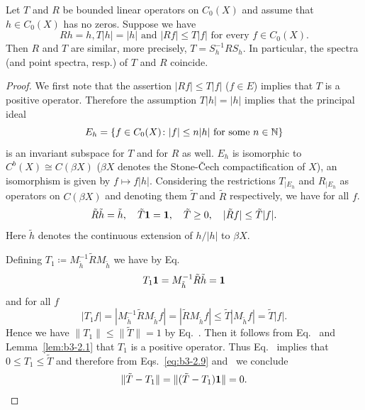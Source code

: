 \begin{lemma}\label{lem:b3-2.3}%
Let $T$ and $R$ be bounded linear operators on $C_{0}(X)$ and assume that $h \in C_{0}(X)$ has no zeros. 
Suppose we have
\begin{equation}\label{eq:b3-2.8}
	Rh = h, T|h| = |h| \text{ and } |Rf| \leq T|f| \text{ for every $f \in C_{0}(X)$.} 
\end{equation}
Then $R$ and $T$ are similar, more precisely, $T = S_{h}^{-1}RS_{h}$.
In particular, the spectra (and point spectra, resp.) of\/ $T$ and $R$ coincide.
\end{lemma}
\begin{proof}
	We first note that the assertion $|Rf| \leq T|f|$ ($f \in E$) implies that $T$ is a positive operator.
	Therefore the assumption $T|h| = |h|$ implies that the principal ideal 
    \[
    E_{h} = \{f \in C_{0}(X) \colon |f| \leq n|h| \text{ for some } n \in \N\}
    \] 
    is an invariant subspace for $T$ and for $R$ as well.
	$E_{h}$ is isomorphic to $C^{b}(X) \cong C(\beta X)$ ($\beta X$ denotes the Stone-Čech compactification of\/ $X$), an isomorphism is given by $f \mapsto f|h|$.
	Considering the restrictions $T_{|E_{h}}$ and $R_{|E_{h}}$ as operators on $C(\beta X)$ and denoting them $\tilde{T}$ and $\tilde{R}$ respectively, we have for all $f$.
\begin{equation}\label{eq:b3-2.9}
		\tilde{R}\tilde{h} = \tilde{h}, \quad \tilde{T}\1 = \1, \quad \tilde{T} \geq 0, \quad |\tilde{R}f| \leq \tilde{T}|f| .
	\end{equation}
	Here $\tilde{h}$ denotes the continuous extension of\/ $h/|h|$ to $\beta X$.
	
	Defining $T_{1} \coloneq M_{\tilde{h}}^{-1}\tilde{R}M_{\tilde{h}}$ we have by Eq.~
	\begin{equation}\label{eq:b3-2.10}
	T_{1}\mathbf{1} = M_{\tilde{h}}^{-1}\tilde{R}\tilde{h} = \mathbf{1} 
	\end{equation}
    and for all $f$ 
	\begin{equation}\label{eq:b3-2.11}
	|T_{1}f| = |M_{\tilde{h}}^{-1}\tilde{R}M_{\tilde{h}}f| = |\tilde{R}M_{\tilde{h}}f| \leq \tilde{T}|M_{\tilde{h}}f| = \tilde{T}|f| .
	\end{equation}
	Hence we have $\|T_{1}\| \leq \|\tilde{T}\| = 1$ by Eq.~.
	Then it follows from Eq.~ and Lemma~\ref{lem:b3-2.1} that $T_{1}$ is a positive operator.
	Thus Eq.~ implies that $0 \leq T_{1} \leq \tilde{T}$ and therefore from Eqs.~\eqref{eq:b3-2.9} and~ we conclude
\begin{equation*}
    \|\tilde{T} - T_{1}\| = \|(\tilde{T} - T_{1})\mathbf{1}\| = 0.
    \qedhere
\end{equation*}
\end{proof}

